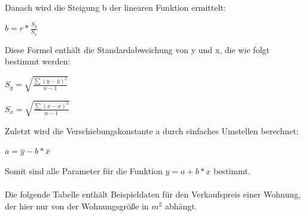 \begin{enumerate}
Danach wird die Steigung b  der linearen Funktion ermittelt:

$b= r*\frac{S_{y}}{S_{x}}$

Diese Formel enthält die Standardabweichung von y und x, die wie folgt bestimmt werden:

$S_{y}= \sqrt{\frac{\sum (y-\bar{y})^{2}}{n-1}}$

$S_{x}= \sqrt{\frac{\sum (x-\bar{x})^{2}}{n-1}}$

Zuletzt wird die Verschiebungskonstante a durch einfaches Umstellen berechnet: 

$a=\bar{y}-b*\bar{x}$

Somit sind alle Parameter für die Funktion $y=a+b*x$ bestimmt. \\\\
Die folgende Tabelle enthält Beispieldaten für den Verkaufspreis einer Wohnung, der hier nur von der Wohnungsgröße in $m^{2}$ abhängt.




\end{enumerate}

